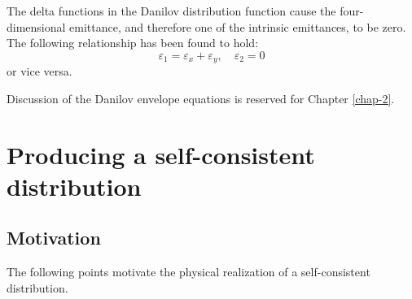 The delta functions in the Danilov distribution function cause the four-dimensional emittance, and therefore one of the intrinsic emittances, to be zero. The following relationship has been found to hold:
%
\begin{equation} \label{eq:mode_emittances2}
    \varepsilon_1 = \varepsilon_x + \varepsilon_y, \quad
    \varepsilon_2 = 0
\end{equation}
%
or vice versa. 

Discussion of the Danilov envelope equations is reserved for Chapter \ref{chap-2}.




\section{Producing a self-consistent distribution}\label{sec:Producing a self-consistent distribution}


\subsection{Motivation}

The following points motivate the physical realization of a self-consistent distribution.

